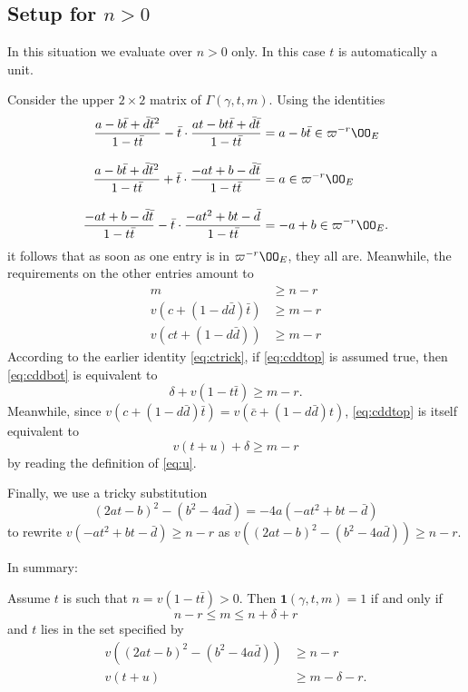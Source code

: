 \subsection{Setup for $n > 0$}
In this situation we evaluate over $n > 0$ only.
In this case $t$ is automatically a unit.

Consider the upper $2 \times 2$ matrix of $\Gamma(\gamma, t, m)$.
Using the identities
\begin{align*}
  \dfrac{a-b\bar t+\bar d \bar t^2}{1-t \bar t}
    - \bar t \cdot \dfrac{at-bt\bar t+\bar d \bar t}{1-t \bar t}
    &= a-b\bar t \in \varpi^{-r} \OO_E \\[2ex]
  \dfrac{a-b\bar t+\bar d \bar t^2}{1-t \bar t}
    + \bar t \cdot \dfrac{-at+b-\bar d \bar t}{1-t \bar t}
    &= a \in \varpi^{-r} \OO_E \\[2ex]
  \dfrac{-at+b-\bar d \bar t}{1-t \bar t}
    - \bar t \cdot \dfrac{-at^2+bt-\bar d}{1-t \bar t}
    &= -a+b \in \varpi^{-r} \OO_E.
\end{align*}
it follows that as soon as one entry is in $\varpi^{-r} \OO_E$, they all are.
Meanwhile, the requirements on the other entries amount to
\begin{align}
  m & \geq n - r \\
  v\left( c+(1-d \bar d) \bar t \right) &\geq m-r \label{eq:cddtop} \\
  v\left( ct+(1-d \bar d) \right) &\geq m-r \label{eq:cddbot}
\end{align}
According to the earlier identity \eqref{eq:ctrick},
if \eqref{eq:cddtop} is assumed true,
then \eqref{eq:cddbot} is equivalent to
\[ \delta + v(1-t \bar t) \ge m-r. \]
Meanwhile, since $v(c+(1-d \bar d) \bar t) = v(\bar c + (1-d \bar d)t)$,
\eqref{eq:cddtop} is itself equivalent to
\[ v(t+u) + \delta \geq m-r \]
by reading the definition of \eqref{eq:u}.

Finally, we use a tricky substitution
\[ (2at-b)^2 - (b^2-4a\bar d) = -4a(-at^2+bt-\bar d) \]
to rewrite $v(-at^2+bt-\bar d) \geq n-r$
as $v\left( (2at-b)^2 - (b^2-4a\bar d) \right) \geq n-r$.

In summary:
\begin{claim}
  Assume $t$ is such that $n = v(1-t \bar t) > 0$.
  Then $\mathbf{1}(\gamma, t, m) = 1$ if and only if
  \[ n - r \leq m \leq n + \delta + r \]
  and $t$ lies in the set specified by
  \begin{align*}
    v\left( (2at-b)^2 - (b^2-4a\bar d) \right) &\geq n-r \\
    v(t+u) &\ge m-\delta-r.
  \end{align*}
\end{claim}

